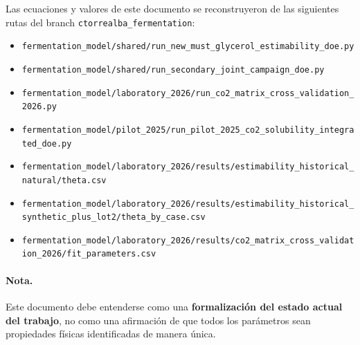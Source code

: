 \documentclass[11pt,a4paper]{article}
\begin{document}
Las ecuaciones y valores de este documento se reconstruyeron de las siguientes rutas del branch
\texttt{ctorrealba\_fermentation}:
\begin{itemize}
    \item \texttt{fermentation\_model/shared/run\_new\_must\_glycerol\_estimability\_doe.py}
    \item \texttt{fermentation\_model/shared/run\_secondary\_joint\_campaign\_doe.py}
    \item \texttt{fermentation\_model/laboratory\_2026/run\_co2\_matrix\_cross\_validation\_2026.py}
    \item \texttt{fermentation\_model/pilot\_2025/run\_pilot\_2025\_co2\_solubility\_integrated\_doe.py}
    \item \texttt{fermentation\_model/laboratory\_2026/results/estimability\_historical\_natural/theta.csv}
    \item \texttt{fermentation\_model/laboratory\_2026/results/estimability\_historical\_synthetic\_plus\_lot2/theta\_by\_case.csv}
    \item \texttt{fermentation\_model/laboratory\_2026/results/co2\_matrix\_cross\_validation\_2026/fit\_parameters.csv}
\end{itemize}

\paragraph{Nota.}
Este documento debe entenderse como una \textbf{formalización del estado actual del trabajo}, no como
una afirmación de que todos los parámetros sean propiedades físicas identificadas de manera única.
\end{document}
